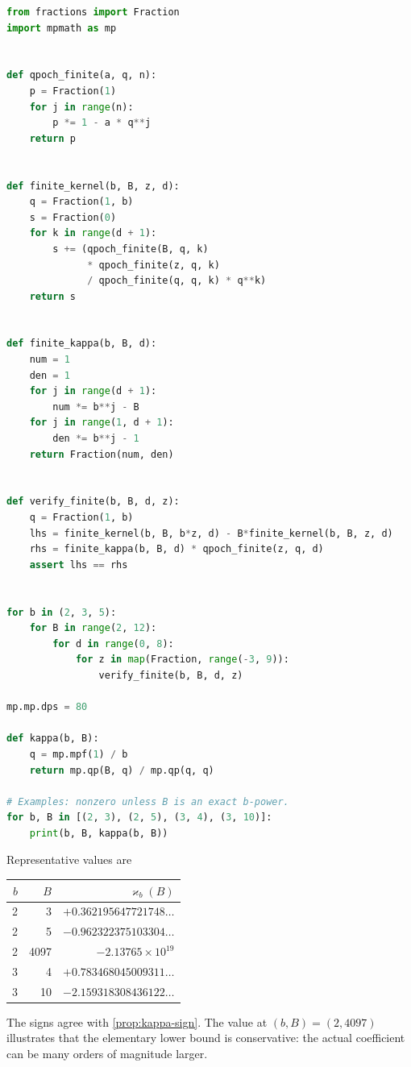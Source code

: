 \documentclass[11pt]{article}
\theoremstyle{definition}
\newcommand{\kk}{\varkappa}
\begin{document}
\begin{lstlisting}[style=code,language=Python,caption={Exact finite and numerical infinite checks}]
from fractions import Fraction
import mpmath as mp


def qpoch_finite(a, q, n):
    p = Fraction(1)
    for j in range(n):
        p *= 1 - a * q**j
    return p


def finite_kernel(b, B, z, d):
    q = Fraction(1, b)
    s = Fraction(0)
    for k in range(d + 1):
        s += (qpoch_finite(B, q, k)
              * qpoch_finite(z, q, k)
              / qpoch_finite(q, q, k) * q**k)
    return s


def finite_kappa(b, B, d):
    num = 1
    den = 1
    for j in range(d + 1):
        num *= b**j - B
    for j in range(1, d + 1):
        den *= b**j - 1
    return Fraction(num, den)


def verify_finite(b, B, d, z):
    q = Fraction(1, b)
    lhs = finite_kernel(b, B, b*z, d) - B*finite_kernel(b, B, z, d)
    rhs = finite_kappa(b, B, d) * qpoch_finite(z, q, d)
    assert lhs == rhs


for b in (2, 3, 5):
    for B in range(2, 12):
        for d in range(0, 8):
            for z in map(Fraction, range(-3, 9)):
                verify_finite(b, B, d, z)

mp.mp.dps = 80

def kappa(b, B):
    q = mp.mpf(1) / b
    return mp.qp(B, q) / mp.qp(q, q)

# Examples: nonzero unless B is an exact b-power.
for b, B in [(2, 3), (2, 5), (3, 4), (3, 10)]:
    print(b, B, kappa(b, B))
\end{lstlisting}

Representative values are
\begin{center}
\begin{tabular}{@{}rrr@{}}
\toprule
$b$ & $B$ & $\kk_b(B)$ \\
\midrule
2 & 3 & $+0.362195647721748\ldots$ \\
2 & 5 & $-0.962322375103304\ldots$ \\
2 & 4097 & $-2.13765\times10^{19}$ \\
3 & 4 & $+0.783468045009311\ldots$ \\
3 & 10 & $-2.159318308436122\ldots$ \\
\bottomrule
\end{tabular}
\end{center}
The signs agree with \cref{prop:kappa-sign}.  The value at $(b,B)=(2,4097)$ illustrates that the elementary lower bound is conservative: the actual coefficient can be many orders of magnitude larger.
\end{document}

